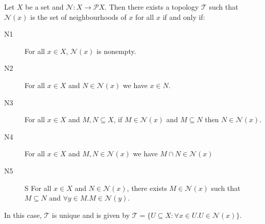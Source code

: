 \begin{prop}
  \label{prop:neighbourhood}
  Let $X$ be a set and $\mathcal{N} : X \rightarrow \mathcal{P} X$. Then there exists a topology $\mathcal{T}$ such that $\mathcal{N}(x)$ is the set of neighbourhoods of $x$ for all $x$ if and only if:
  \begin{description}
    \item[N1]
    For all $x \in X$, $\mathcal{N}(x)$ is nonempty.
    \item[N2]
    For all $x \in X$ and $N \in \mathcal{N}(x)$ we have $x \in N$.
    \item[N3]
    For all $x \in X$ and $M, N \subseteq X$, if $M \in \mathcal{N}(x)$ and $M \subseteq N$ then $N \in \mathcal{N}(x)$.
    \item[N4]
    For all $x \in X$ and $M, N \in \mathcal{N}(x)$ we have $M \cap N \in \mathcal{N}(x)$
    \item[N5]S
    For all $x \in X$ and $N \in \mathcal{N}(x)$, there exists $M \in \mathcal{N}(x)$ such that $M \subseteq N$ and $\forall y \in M. M \in \mathcal{N}(y)$.
  \end{description}
  In this case, $\mathcal{T}$ is unique and is given by $\mathcal{T} = \{ U \subseteq X : \forall x \in U. U \in \mathcal{N}(x) \}$.
\end{prop}

